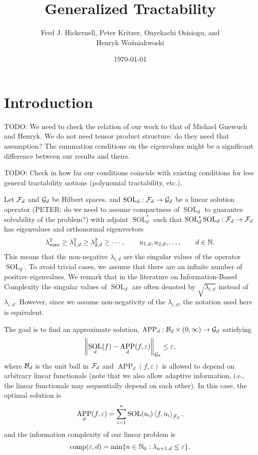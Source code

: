 \documentclass[11pt,a4paper]{article}
\DeclareMathOperator{\SOL}{SOL}
\DeclareMathOperator{\APP}{APP}
\newcommand{\fred}[1]{\begingroup\color{blue}#1\endgroup}
\newcommand{\peter}[1]{\begingroup\color{purple}#1\endgroup}
\newcommand{\kachi}[1]{\begingroup\color{ForestGreen}#1\endgroup}
\begin{document}
\newtheorem{theorem}{Theorem}
\theoremstyle{definition}
\newtheorem{definition}{Definition}


\title{Generalized Tractability}
\author{\fred{Fred J. Hickernell}, \peter{Peter Kritzer}, \kachi{Onyekachi Osisiogu}, and \\ Henryk Wo\'zniakwoski}
\date{\today}

\maketitle

\section{Introduction}

TODO: We need to check the relation of our work to that of Michael Gnewuch and Henryk. We do not need tensor product structure: do they need that assumption? The summation conditions on the eigenvalues might be a significant difference between our results and theirs.

\medskip

TODO: Check in how far our conditions coincide with existing conditions for less general tractability notions (polynomial tractability, etc.).

\medskip

Let $\mathcal{F}_d$ and $\mathcal{G}_d$ be Hilbert spaces, and $\SOL_d : \cf_d \to \cg_d$ be a linear solution operator \peter{(PETER: do we need to assume compactness of $\SOL_d$ to guarantee solvability of the problem?)} with adjoint $\SOL_d^*$ such that $\SOL_d^*\SOL_d : \cf_d \to \cf_d$ has eigenvalues and orthonormal eigenvectors
\begin{equation} \label{eq:eigenvalues}
\lambda_{\max}^2 \ge \lambda_{1,d}^2 \ge \lambda_{2,d}^2 \ge \cdots, \qquad u_{1,d}, u_{2,d}, \ldots, \qquad d \in \mathbb{N}.
\end{equation}
This means that the non-negative $\lambda_{i,d}$ are the singular values of the \peter{operator} $\SOL_d$. To avoid trivial cases, we assume that there are an infinite number of positive eigenvalues. \peter{We remark that in the literature on Information-Based Complexity the singular values of $\SOL_d$ are often denoted by $\sqrt{\lambda_{i,d}}$ instead of $\lambda_{i,d}$. However, since we assume non-negativity of the $\lambda_{i,d}$, the notation used here is equivalent.}


The goal is to find an approximate solution, $\APP_d:\cb_d \times (0,\infty) \to \cg_d$ satisfying
\[
\norm[\cg_d]{\SOL_d(f) - \APP_d(f,\varepsilon)} \le \varepsilon,
\]
where $\mathcal{B}_d$ is the unit ball in $\mathcal{F}_d$ and $\APP_d(f,\varepsilon)$ is allowed to depend on arbitrary linear functionals \peter{(note that we also allow adaptive information, i.e., the linear functionals may sequentially depend on each other)}.  In this case, the optimal solution is
\[
\APP_d(f,\varepsilon) = \sum_{i=1}^n \SOL(u_i) \ip[\cf_d]{f}{u_i},
\]
and the \peter{information} complexity of our linear problem is
\begin{equation}\label{eq:comp_def}
\operatorname{comp}(\varepsilon, d) = \min \{n \in \mathbb{N}_{0} : \lambda_{n+1, d} \le \varepsilon\}.
\end{equation}
\end{document}
